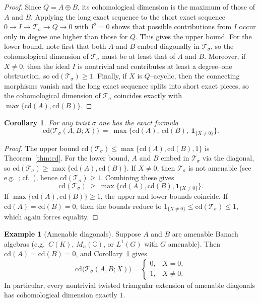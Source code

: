 \documentclass{article}
\theoremstyle{plain}
\newtheorem{cor}[theorem]{Corollary}
\theoremstyle{definition}
\newtheorem{example}[theorem]{Example}
\newcommand{\T}{\mathcal{T}}
\begin{document}
\begin{proof}
Since $Q=A\oplus B$, its cohomological dimension is the maximum of those of $A$ and $B$.
Applying the long exact sequence to the short exact sequence $0\to I\to \T_\sigma\to Q\to 0$ with $I^2=0$ shows that possible contributions from $I$ occur only in degree one higher than those for $Q$.
This gives the upper bound.
For the lower bound, note first that both $A$ and $B$ embed diagonally in $\T_\sigma$, so the cohomological dimension of $\T_\sigma$ must be at least that of $A$ and $B$.
Moreover, if $X\neq 0$, then the ideal $I$ is nontrivial and contributes at least a degree--one obstruction, so $\mathrm{cd}(\T_\sigma)\ge 1$.
Finally, if $X$ is $Q$--acyclic, then the connecting morphisms vanish and the long exact sequence splits into short exact pieces, so the cohomological dimension of $\T_\sigma$ coincides exactly with $\max\{\mathrm{cd}(A),\mathrm{cd}(B)\}$.
\end{proof}
\begin{cor}\label{cor:cd-exact}
For any twist $\sigma$ one has the exact formula
\[
\mathrm{cd}\bigl(\T_\sigma(A,B;X)\bigr)
\ =\
\max\!\bigl\{\mathrm{cd}(A),\ \mathrm{cd}(B),\ \mathbf{1}_{\{X\neq 0\}}\bigr\}.
\]
\end{cor}

\begin{proof}
The upper bound $\mathrm{cd}(\T_\sigma)\le \max\{\mathrm{cd}(A),\mathrm{cd}(B),1\}$ is Theorem~\ref{thm:cd}.
For the lower bound, $A$ and $B$ embed in $\T_\sigma$ via the diagonal,
so $\mathrm{cd}(\T_\sigma)\ge \max\{\mathrm{cd}(A),\mathrm{cd}(B)\}$.
If $X\neq 0$, then $\T_\sigma$ is not amenable (see e.g.\ \cite{BehnamianMahmoodi2020};
cf.\ \cite[Ch.~VII]{HelemskiiHomology}), hence $\mathrm{cd}(\T_\sigma)\ge 1$.
Combining these gives
\[
\mathrm{cd}(\T_\sigma)\ \ge\ \max\{\mathrm{cd}(A),\mathrm{cd}(B),\mathbf{1}_{\{X\neq 0\}}\}.
\]
If $\max\{\mathrm{cd}(A),\mathrm{cd}(B)\}\ge 1$, the upper and lower bounds coincide.
If $\mathrm{cd}(A)=\mathrm{cd}(B)=0$, then the bounds reduce to
$1_{\{X\neq 0\}}\le \mathrm{cd}(\T_\sigma)\le 1$, which again forces equality.
\end{proof}
\begin{example}[Amenable diagonals]\label{ex:cd-amenable-diagonals}
Suppose $A$ and $B$ are amenable Banach algebras (e.g.\ $C(K)$, $M_n(\mathbb{C})$,
or $L^1(G)$ with $G$ amenable). Then $\mathrm{cd}(A)=\mathrm{cd}(B)=0$, and
Corollary~\ref{cor:cd-exact} gives
\[
\mathrm{cd}\bigl(\T_\sigma(A,B;X)\bigr)=
\begin{cases}
0, & X=0,\\[2pt]
1, & X\neq 0.
\end{cases}
\]
In particular, every nontrivial twisted triangular extension of amenable diagonals has
cohomological dimension exactly $1$.
\end{example}
\end{document}
